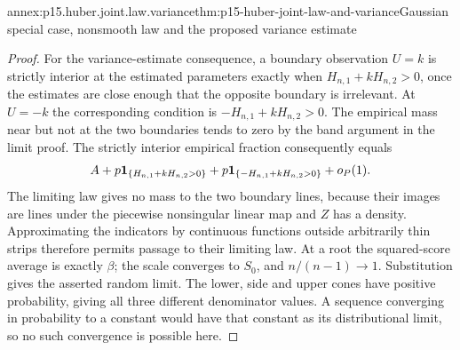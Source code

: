 \begin{annexitem}{annex:p15.huber.joint.law.variance}{thm:p15-huber-joint-law-and-variance}{Gaussian special case, nonsmooth law and the proposed variance estimate}
\begin{proof}
For the variance-estimate consequence, a boundary observation
\(U=k\) is strictly interior at the estimated parameters exactly
when \(H_{n,1}+kH_{n,2}>0\), once the estimates are close enough
that the opposite boundary is irrelevant.
At \(U=-k\) the corresponding condition is
\(-H_{n,1}+kH_{n,2}>0\).
The empirical mass near but not at the two boundaries tends
to zero by the band argument in the limit proof.
The strictly interior empirical fraction consequently equals
\[
 A+p{\bf1}_{\{H_{n,1}+kH_{n,2}>0\}}
   +p{\bf1}_{\{-H_{n,1}+kH_{n,2}>0\}}+o_P(1).
\]
The limiting law gives no mass to the two boundary lines,
because their images are lines under the piecewise nonsingular
linear map and \(Z\) has a density.
Approximating the indicators by continuous functions outside
arbitrarily thin strips therefore permits passage to their
limiting law.
At a root the squared-score average is exactly \(\beta\);
the scale converges to \(S_0\), and \(n/(n-1)\to1\).
Substitution gives the asserted random limit.
The lower, side and upper cones have positive probability,
giving all three different denominator values.
A sequence converging in probability to a constant would have
that constant as its distributional limit, so no such convergence
is possible here.
\end{proof}
\end{annexitem}

